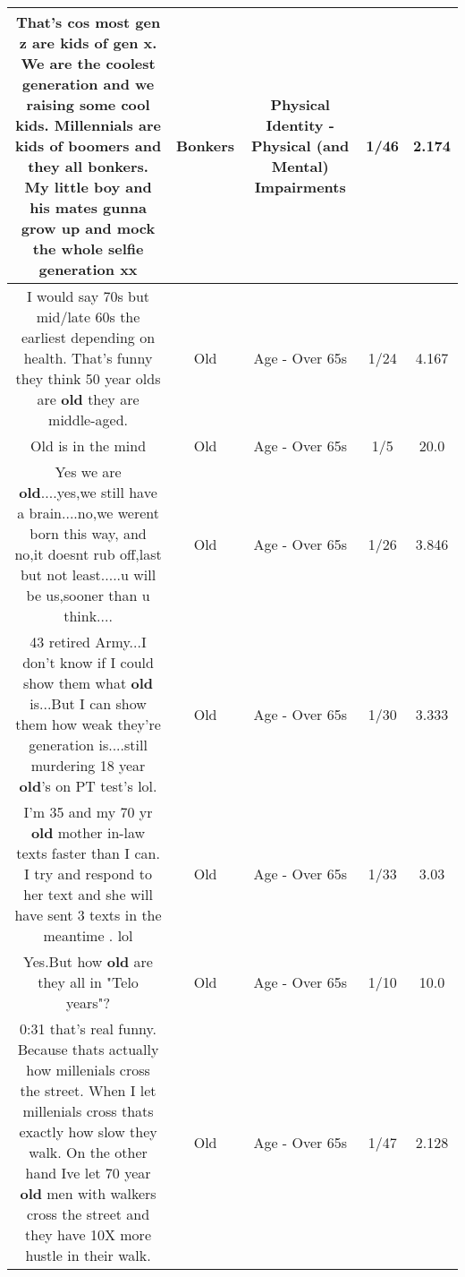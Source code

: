 \documentclass[11pt]{article}
\newlength\mylength
\begin{document}
\begin{center}
\begin{longtable}{|C{.65\mylength}|C{.30\mylength}|C{.12\mylength}|C{.12\mylength}|C{.12\mylength}|}
  \small That's cos most gen z are kids of gen x. We are the coolest generation and we raising some cool kids. Millennials are kids of boomers and they all \textbf{bonkers}. My little boy and his mates gunna grow up and mock the whole selfie generation xx\normalsize   & Bonkers & Physical Identity - Physical (and Mental) Impairments & 1/46 & 2.174 \\  \hline
  \small I would say 70s but mid/late 60s the earliest depending on health. That's funny they think 50 year olds are \textbf{old} they are middle-aged.\normalsize   & Old & Age - Over 65s & 1/24 & 4.167 \\  \hline
  \small Old is in the mind\normalsize   & Old & Age - Over 65s & 1/5 & 20.0 \\  \hline
  \small Yes we are \textbf{old}....yes,we still have a brain....no,we werent born this way, and no,it doesnt rub off,last but not least.....u will be us,sooner than u think....\normalsize   & Old & Age - Over 65s & 1/26 & 3.846 \\  \hline
  \small 43 retired Army...I don't know if I could show them what \textbf{old} is...But I can show them how weak they're generation is....still murdering 18 year \textbf{old}'s on PT test's lol.\normalsize   & Old & Age - Over 65s & 1/30 & 3.333 \\  \hline
  \small I'm 35 and my 70 yr \textbf{old} mother in-law texts faster than I can. I try and respond to her text and she will have sent 3 texts in the meantime . lol\normalsize   & Old & Age - Over 65s & 1/33 & 3.03 \\  \hline
  \small Yes.But how \textbf{old} are they all in "Telo years"?\normalsize   & Old & Age - Over 65s & 1/10 & 10.0 \\  \hline
  \small 0:31 that's real funny. Because thats actually how millenials cross the street. When I let millenials cross thats exactly how slow they walk. On the other hand Ive let 70 year \textbf{old} men with walkers cross the street and they have 10X more hustle in their walk.\normalsize   & Old & Age - Over 65s & 1/47 & 2.128 \\  \hline

\end{longtable}
\end{center}
\end{document}

